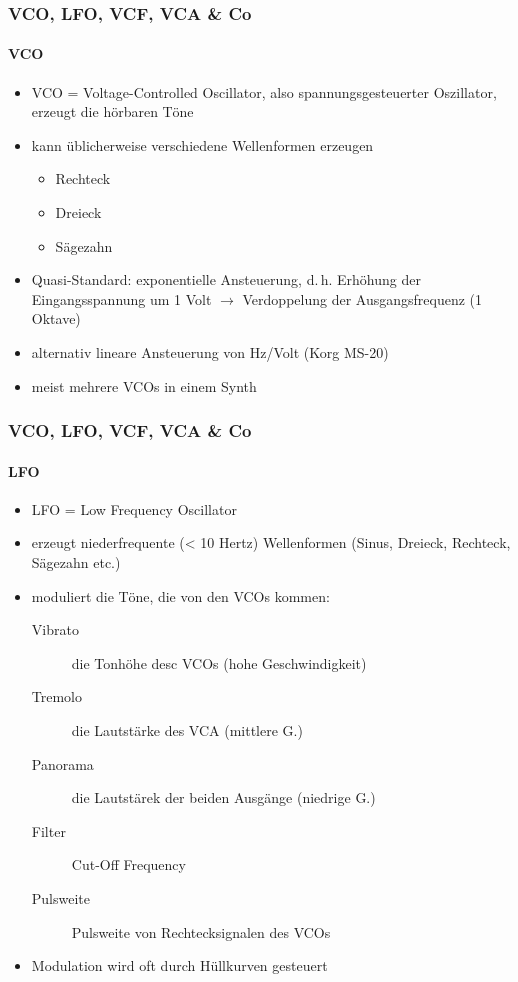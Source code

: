 \documentclass[11pt,ngerman]{beamer}
\begin{document}
\begin{frame}
\frametitle{VCO, LFO, VCF, VCA \& Co}
\framesubtitle{VCO}

\begin{itemize}
	\item VCO = Voltage-Controlled Oscillator, also spannungsgesteuerter Oszillator, erzeugt die hörbaren Töne
	\item kann üblicherweise verschiedene Wellenformen erzeugen
	\begin{itemize}
		\item Rechteck
		\item Dreieck
		\item Sägezahn
	\end{itemize}
	
	\item Quasi-Standard: exponentielle Ansteuerung, d.\,h. Erhöhung der Eingangsspannung um 1 Volt $\rightarrow$ Verdoppelung der Ausgangsfrequenz (1 Oktave)
	\item alternativ lineare Ansteuerung von Hz/Volt (Korg MS-20)
	\item meist mehrere VCOs in einem Synth 
\end{itemize}

\end{frame}

\begin{frame}
\frametitle{VCO, LFO, VCF, VCA \& Co}
\framesubtitle{LFO}

\begin{itemize}
\item LFO = Low Frequency Oscillator
\item erzeugt niederfrequente (< 10 Hertz) Wellenformen (Sinus, Dreieck, Rechteck, Sägezahn etc.)
\item moduliert die Töne, die von den VCOs kommen:

\begin{description}
\item[Vibrato] die Tonhöhe desc VCOs (hohe Geschwindigkeit)
\item[Tremolo] die Lautstärke des VCA (mittlere G.)
\item[Panorama] die Lautstärek der beiden Ausgänge (niedrige G.)
\item[Filter] Cut-Off Frequency
\item[Pulsweite] Pulsweite von Rechtecksignalen des VCOs
\end{description}

\item Modulation wird oft durch Hüllkurven gesteuert
\end{itemize}
\end{frame}
\end{document}
